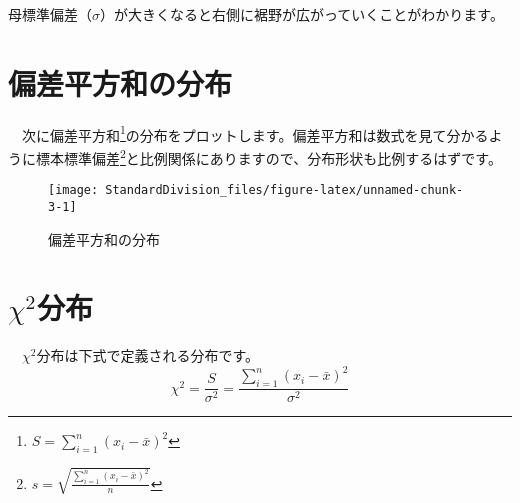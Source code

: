 \documentclass[]{tufte-handout}
\begin{document}
母標準偏差（\(\sigma\)）が大きくなると右側に裾野が広がっていくことがわかります。

\newpage

\hypertarget{ux504fux5deeux5e73ux65b9ux548cux306eux5206ux5e03}{%
\section{偏差平方和の分布}\label{ux504fux5deeux5e73ux65b9ux548cux306eux5206ux5e03}}

　次に偏差平方和\footnote{\(S = \sum_{i = 1}^{n}{(x_i - \bar{x})^2}\)}の分布をプロットします。偏差平方和は数式を見て分かるように標本標準偏差\footnote{\(s = \sqrt{\frac{\sum_{i = 1}^{n}{(x_i - \bar{x})^2}}{n}}\)}と比例関係にありますので、分布形状も比例するはずです。

\begin{figure}

{\centering \texttt{[image: StandardDivision\_files/figure-latex/unnamed-chunk-3-1]} 

}

\caption[偏差平方和の分布]{偏差平方和の分布}\label{fig:unnamed-chunk-3}
\end{figure}

\hypertarget{chi2ux5206ux5e03}{%
\section{\texorpdfstring{\(\chi^2\)分布}{\textbackslash chi\^{}2分布}}\label{chi2ux5206ux5e03}}

　\(\chi^2\)分布は下式で定義される分布です。 　
\[\chi^2 = \frac{S}{\sigma^2} = \frac{\sum_{i = 1}^{n}{(x_i - \bar{x})^2}}{\sigma^2}\]


\end{document}

